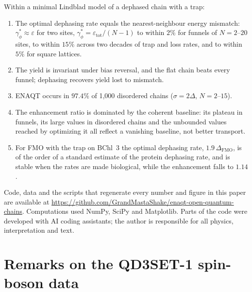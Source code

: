 \documentclass[aps,pre,preprint,floatfix]{revtex4-2}
\newcommand{\gps}{\gamma_\phi^*}
\begin{document}
Within a minimal Lindblad model of a dephased chain with a trap:
\begin{enumerate}
\item The optimal dephasing rate equals the nearest-neighbour energy mismatch:
  $\gps\approx\varepsilon$ for two sites, $\gps=\varepsilon_\text{tot}/(N-1)$
  to within $2\%$ for funnels of $N=2$--$20$ sites, to within $15\%$ across
  two decades of trap and loss rates, and to within $5\%$ for square lattices.
\item The yield is invariant under bias reversal, and the flat chain beats
  every funnel; dephasing recovers yield lost to mismatch.
\item ENAQT occurs in $97.4\%$ of 1{,}000 disordered chains
  ($\sigma=2\Delta$, $N=2$--$15$).
\item The enhancement ratio is dominated by the coherent baseline: its
  plateau in funnels, its large values in disordered chains and the unbounded
  values reached by optimizing it all reflect a vanishing baseline, not better
  transport.
\item For FMO with the trap on BChl~3 the optimal dephasing rate,
  $1.9\,\Delta_\text{FMO}$, is of the order of a standard estimate of the
  protein dephasing rate, and is stable when the rates are made
  biological, while the enhancement falls to $1.14$.
\end{enumerate}

\begin{acknowledgments}
Code, data and the scripts that regenerate every number and figure in this
paper are available at
\url{https://github.com/GrandMastaShake/enaqt-open-quantum-chains}.
Computations used NumPy, SciPy and Matplotlib.
Parts of the code were developed with AI coding assistants; the author is
responsible for all physics, interpretation and text.
\end{acknowledgments}

\appendix

\section{\label{app:heom}Remarks on the QD3SET-1 spin-boson data}
\end{document}
